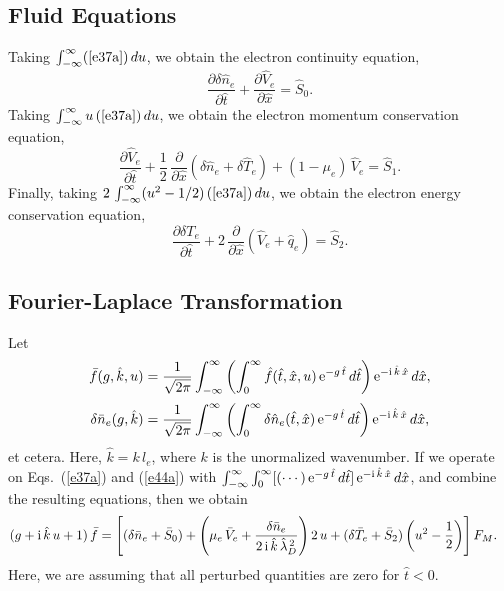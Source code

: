 \documentclass[12pt,prb,aps]{revtex4-1}
\begin{document}
\subsection{Fluid Equations}
Taking $\int_{-\infty}^\infty (\ref{e37a})\,du$, we obtain the electron continuity equation,
\begin{equation}\label{econt}
\frac{\partial\delta\hat{n}_e}{\partial\hat{t}}+\frac{\partial\hat{V}_e}{\partial\hat{x}} = \hat{S}_0.
\end{equation}
Taking $\int_{-\infty}^\infty u\,(\ref{e37a})\,du$, we obtain the electron momentum conservation equation, 
\begin{equation}\label{eforce}
\frac{\partial\hat{V}_e}{\partial\hat{t}}+\frac{1}{2}\,\frac{\partial}{\partial\hat{x}}(\delta\hat{n}_e+\delta\hat{T}_e) + (1-\mu_e)\,\hat{V}_e = \hat{S}_1.
\end{equation}
Finally, taking $2\,\int_{-\infty}^\infty (u^2-1/2)\,(\ref{e37a})\,du$, we obtain
 the electron  energy conservation equation,
\begin{equation}\label{eenergy}
\frac{\partial\delta T_e}{\partial\hat{t}} +2\,\frac{\partial}{\partial\hat{x}}(\hat{V}_e+\hat{q}_e)= \hat{S}_2.
\end{equation}


\subsection{Fourier-Laplace Transformation}
Let
\begin{align}
\bar{f}(g,\hat{k},u) &= \frac{1}{\sqrt{2\pi}}\int_{-\infty}^\infty\left(\int_0^\infty \hat{f}(\hat{t},\hat{x},u)\,{\rm e}^{-g\,\hat{t}}\,d\hat{t}\right){\rm e}^{-{\rm i}\,\hat{k}\,\hat{x}}\,d\hat{x},\\[0.5ex]
\delta\bar{n}_e(g,\hat{k}) &=\frac{1}{\sqrt{2\pi}} \int_{-\infty}^\infty\left(\int_0^\infty \delta \hat{n}_e(\hat{t},\hat{x})\,{\rm e}^{-g\,\hat{t}}\,d\hat{t}\right){\rm e}^{-{\rm i}\,\hat{k}\,\hat{x}}\,d\hat{x},
\label{e41x}
\end{align}
et cetera.
Here,
$\hat{k}= k\,l_e$,
where $k$ is the unormalized wavenumber.
If we operate on Eqs.~(\ref{e37a}) and (\ref{e44a}) with $\int_{-\infty}^\infty\int_0^\infty[(\cdots)\,{\rm e}^{-g\,\hat{t}}\,d\hat{t}]\,{\rm e}^{-{\rm i}\,\hat{k}\,\hat{x}}\,d\hat{x}$, 
and combine the
resulting equations, then we obtain
\begin{align}\label{e55x}
(g+{\rm i}\,\hat{k}\,u+1)\,\bar{f}&= \left[(\delta\bar{n}_e+\bar{S}_0)+\left(\mu_e\,\bar{V}_e+\frac{\delta\bar{n}_e}{2\,{\rm i}\,\hat{k}\,\hat{\lambda}_D^{\,2}}\right)2\,u+(\delta\bar{T}_e+\bar{S}_2)\left(u^2-\frac{1}{2}\right)\right] F_M.
\end{align}
Here, we are assuming that all perturbed quantities are zero for $\hat{t}<0$. 
\end{document}

